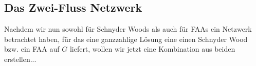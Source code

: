 


\subsection{Das Zwei-Fluss Netzwerk}

Nachdem wir nun sowohl für Schnyder Woods als auch für FAAs ein Netzwerk betrachtet haben, für das eine ganzzahlige Lösung eine einen Schnyder Wood bzw. ein FAA auf $G$ liefert, wollen wir jetzt eine Kombination aus beiden erstellen...

